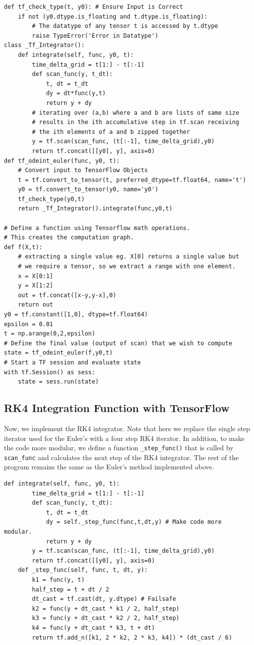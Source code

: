 \documentclass[10pt,letterpaper]{article}
\begin{document}
\begin{verbatim}
def tf_check_type(t, y0): # Ensure Input is Correct
    if not (y0.dtype.is_floating and t.dtype.is_floating): 
        # The datatype of any tensor t is accessed by t.dtype
        raise TypeError('Error in Datatype')
class _Tf_Integrator():
    def integrate(self, func, y0, t): 
        time_delta_grid = t[1:] - t[:-1]  
        def scan_func(y, t_dt): 
            t, dt = t_dt
            dy = dt*func(y,t)
            return y + dy
        # iterating over (a,b) where a and b are lists of same size
        # results in the ith accumulative step in tf.scan receiving
        # the ith elements of a and b zipped together
        y = tf.scan(scan_func, (t[:-1], time_delta_grid),y0) 
        return tf.concat([[y0], y], axis=0)
def tf_odeint_euler(func, y0, t):
    # Convert input to TensorFlow Objects
    t = tf.convert_to_tensor(t, preferred_dtype=tf.float64, name='t')
    y0 = tf.convert_to_tensor(y0, name='y0')
    tf_check_type(y0,t)
    return _Tf_Integrator().integrate(func,y0,t)
    
# Define a function using Tensorflow math operations. 
# This creates the computation graph.
def f(X,t):
    # extracting a single value eg. X[0] returns a single value but
    # we require a tensor, so we extract a range with one element.
    x = X[0:1] 
    y = X[1:2]
    out = tf.concat([x-y,y-x],0)
    return out
y0 = tf.constant([1,0], dtype=tf.float64)
epsilon = 0.01
t = np.arange(0,2,epsilon)
# Define the final value (output of scan) that we wish to compute
state = tf_odeint_euler(f,y0,t)
# Start a TF session and evaluate state
with tf.Session() as sess:
    state = sess.run(state)
\end{verbatim}

\subsection*{RK4 Integration Function with TensorFlow}

Now, we implement the RK4 integrator. Note that here we replace the single step iterator used for the Euler's with a four step RK4 iterator. In addition, to make the code more modular, we define a function \texttt{\_step\_func()} that is called by \texttt{scan\_func} and calculates the next step of the RK4 integrator. The rest of the program remains the same as the Euler's method implemented above.

\begin{verbatim}
def integrate(self, func, y0, t): 
        time_delta_grid = t[1:] - t[:-1]
        def scan_func(y, t_dt): 
            t, dt = t_dt
            dy = self._step_func(func,t,dt,y) # Make code more modular.
            return y + dy
        y = tf.scan(scan_func, (t[:-1], time_delta_grid),y0)
        return tf.concat([[y0], y], axis=0)
    def _step_func(self, func, t, dt, y):
        k1 = func(y, t)
        half_step = t + dt / 2
        dt_cast = tf.cast(dt, y.dtype) # Failsafe
        k2 = func(y + dt_cast * k1 / 2, half_step)
        k3 = func(y + dt_cast * k2 / 2, half_step)
        k4 = func(y + dt_cast * k3, t + dt)
        return tf.add_n([k1, 2 * k2, 2 * k3, k4]) * (dt_cast / 6)
\end{verbatim}
\end{document}
